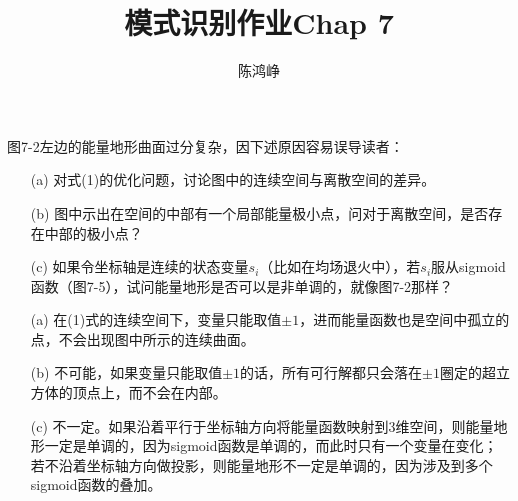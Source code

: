\documentclass[reportComp]{thesis}
\title{模式识别作业Chap 7}
\author{陈鸿峥}
\begin{document}
\maketitle

\begin{question}[\textsection 7 Q3]
图7-2左边的能量地形曲面过分复杂，因下述原因容易误导读者：
\begin{itemize}
	\item [(a)] 对式(1)的优化问题，讨论图中的连续空间与离散空间的差异。
	\item [(b)] 图中示出在空间的中部有一个局部能量极小点，问对于离散空间，是否存在中部的极小点？
	\item [(c)] 如果令坐标轴是连续的状态变量$s_i$（比如在均场退火中），若$s_i$服从sigmoid函数（图7-5），试问能量地形是否可以是非单调的，就像图7-2那样？
\end{itemize}
\end{question}
\begin{answer}
\begin{itemize}
	\item [(a)] 在(1)式的连续空间下，变量只能取值$\pm 1$，进而能量函数也是空间中孤立的点，不会出现图中所示的连续曲面。
	\item [(b)] 不可能，如果变量只能取值$\pm 1$的话，所有可行解都只会落在$\pm 1$圈定的超立方体的顶点上，而不会在内部。
	\item [(c)] 不一定。如果沿着平行于坐标轴方向将能量函数映射到3维空间，则能量地形一定是单调的，因为sigmoid函数是单调的，而此时只有一个变量在变化；若不沿着坐标轴方向做投影，则能量地形不一定是单调的，因为涉及到多个sigmoid函数的叠加。
\end{itemize}
\end{answer}
\end{document}

